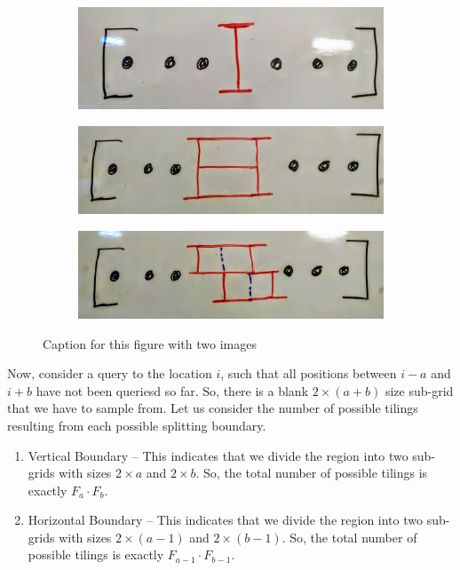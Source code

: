 \begin{figure}[h]
    \centering
    \begin{subfigure}[b]{0.4\textwidth}
        \includegraphics[width=\linewidth]{images/tile2-0.jpg}
        \label{fig:b20}
    \end{subfigure}
    \begin{subfigure}[b]{0.4\textwidth}
        \includegraphics[width=\linewidth]{images/tile2-1.jpg}
        \label{fig:b21}
    \end{subfigure}

    \begin{subfigure}[b]{0.5\textwidth}
        \includegraphics[width=\linewidth]{images/tile2-2.jpg}
        \label{fig:b22}
    \end{subfigure}
    \caption{Caption for this figure with two images}
    \label{fig:boundary2}
\end{figure}

Now, consider a query to the location $i$, such that all positions between $i-a$ and $i+b$ have not been queriesd so far.
So, there is a blank $2\times(a+b)$ size sub-grid that we have to sample from.
Let us consider the number of possible tilings resulting from each possible splitting boundary.
\begin{enumerate}
    \item Vertical Boundary -- This indicates that we divide the region into two sub-grids with sizes
          $2\times a$ and $2\times b$.
          So, the total number of possible tilings is exactly $F_a\cdot F_b$.
    \item Horizontal Boundary -- This indicates that we divide the region into two sub-grids with sizes
          $2\times (a-1)$ and $2\times (b-1)$.
          So, the total number of possible tilings is exactly $F_{a-1}\cdot F_{b-1}$.
\end{enumerate}

